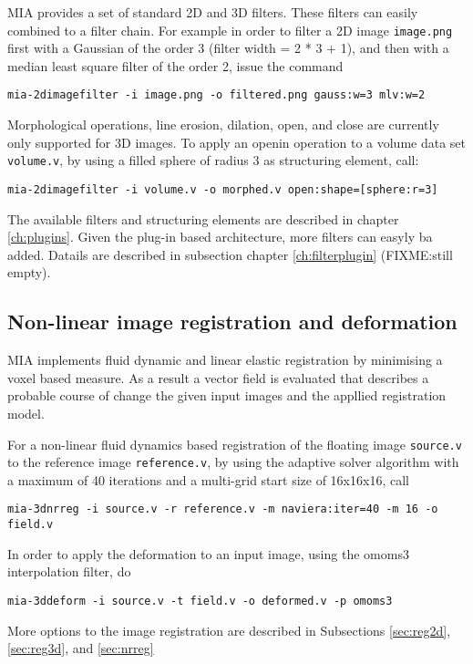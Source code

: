 MIA provides a set of standard 2D and 3D filters. 
These filters can easily combined  to a filter chain. 
For example in order to filter a 2D image \texttt{image.png} first with a Gaussian of the order 3 (filter width = 2 * 3 + 1), and then with a 
  median least square filter of the order 2, issue the command 
\begin{lstlisting}
mia-2dimagefilter -i image.png -o filtered.png gauss:w=3 mlv:w=2
\end{lstlisting}

Morphological operations, line erosion, dilation, open, and close are currently only supported for 3D images. 
To apply an openin operation to a volume data set \texttt{volume.v}, by using a filled sphere of radius 3 as structuring element, 
  call: 
\begin{lstlisting}
mia-2dimagefilter -i volume.v -o morphed.v open:shape=[sphere:r=3]
\end{lstlisting}

The available filters and structuring elements are described in chapter \ref{ch:plugins}. 
Given the plug-in based architecture, more filters can easyly ba added.
Datails are described in subsection  chapter \ref{ch:filterplugin} (FIXME:still empty).

\subsection{Non-linear image registration and deformation}

MIA implements fluid dynamic and linear elastic registration by minimising a voxel based measure. 
As a result a vector field is evaluated that describes a probable course of change the given input images and the appllied registration model. 

For a non-linear fluid dynamics based registration of the floating image \texttt{source.v} to the reference image \texttt{reference.v}, by using the 
 adaptive solver algorithm \cite{wollny02comput} with a maximum of 40 iterations and a multi-grid start size of 16x16x16, call 

\begin{lstlisting}
mia-3dnrreg -i source.v -r reference.v -m naviera:iter=40 -m 16 -o field.v 
\end{lstlisting}

\noindent 
In order to apply the deformation to an input image, using the omoms3 interpolation filter, do 
\begin{lstlisting}
mia-3ddeform -i source.v -t field.v -o deformed.v -p omoms3
\end{lstlisting}

\noindent 
More options to the image registration are described in Subsections \ref{sec:reg2d}, \ref{sec:reg3d}, and \ref{sec:nrreg}





